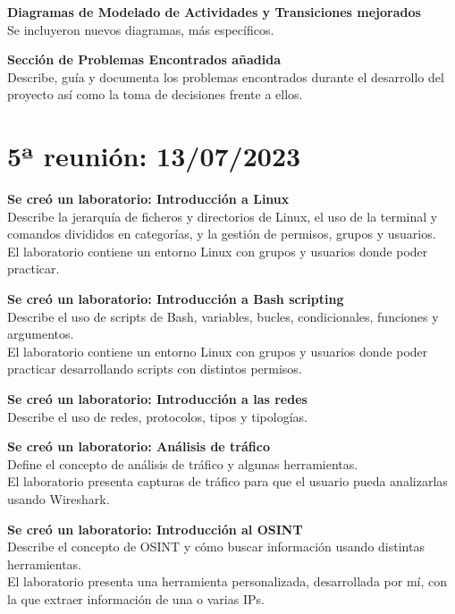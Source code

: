         \textbf{Diagramas de Modelado de Actividades y Transiciones mejorados} \\
        Se incluyeron nuevos diagramas, más específicos.

        \textbf{Sección de Problemas Encontrados añadida} \\
        Describe, guía y documenta los problemas encontrados durante el desarrollo del proyecto así como la toma de decisiones frente a ellos.


    \section{5ª reunión: 13/07/2023}

        \textbf{Se creó un laboratorio: Introducción a Linux} \\
        Describe la jerarquía de ficheros y directorios de Linux, el uso de la terminal y comandos divididos en categorías, y la gestión de permisos, grupos y usuarios. \\
        El laboratorio contiene un entorno Linux con grupos y usuarios donde poder practicar.

        \textbf{Se creó un laboratorio: Introducción a Bash scripting} \\
        Describe el uso de scripts de Bash, variables, bucles, condicionales, funciones y argumentos. \\
        El laboratorio contiene un entorno Linux con grupos y usuarios donde poder practicar desarrollando scripts con distintos permisos.

        \textbf{Se creó un laboratorio: Introducción a las redes} \\
        Describe el uso de redes, protocolos, tipos y tipologías.

        \textbf{Se creó un laboratorio: Análisis de tráfico} \\
        Define el concepto de análisis de tráfico y algunas herramientas. \\
        El laboratorio presenta capturas de tráfico para que el usuario pueda analizarlas usando Wireshark.

        \textbf{Se creó un laboratorio: Introducción al OSINT} \\
        Describe el concepto de OSINT y cómo buscar información usando distintas herramientas. \\
        El laboratorio presenta una herramienta personalizada, desarrollada por mí, con la que extraer información de una o varias IPs.

